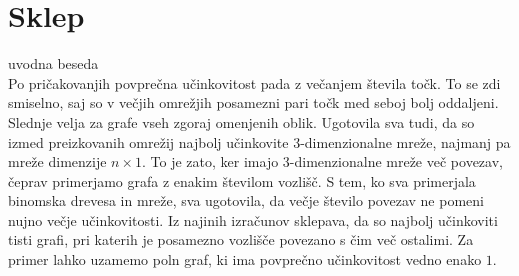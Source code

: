 \documentclass[a4paper, 16pt]{article}
\begin{document}
\section{Sklep}
uvodna beseda\\
Po pričakovanjih povprečna učinkovitost pada z večanjem števila točk.
To se zdi smiselno, saj so v večjih omrežjih posamezni pari točk med seboj bolj oddaljeni.
Slednje velja za grafe vseh zgoraj omenjenih oblik. 
Ugotovila sva tudi, da so izmed preizkovanih omrežij najbolj učinkovite 3-dimenzionalne mreže, 
najmanj pa mreže dimenzije $n \times 1$. To je zato, ker imajo 3-dimenzionalne mreže več povezav, čeprav primerjamo grafa z enakim številom vozlišč.
S tem, ko sva primerjala binomska drevesa in mreže, sva ugotovila, da večje število povezav ne pomeni nujno večje učinkovitosti. 
Iz najinih izračunov sklepava, da so najbolj učinkoviti tisti grafi, pri katerih je posamezno vozlišče povezano s čim več ostalimi. 
Za primer lahko uzamemo poln graf, ki ima povprečno učinkovitost vedno enako $1$.
\end{document}
